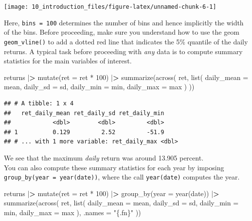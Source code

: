 \documentclass[
]{book}
\newenvironment{Shaded}{\begin{snugshade}}{\end{snugshade}}
\newcommand{\AttributeTok}[1]{\textcolor[rgb]{0.61,0.61,0.61}{#1}}
\newcommand{\DecValTok}[1]{\textcolor[rgb]{0.06,0.06,0.06}{#1}}
\newcommand{\ErrorTok}[1]{\textcolor[rgb]{0.14,0.14,0.14}{\textbf{#1}}}
\newcommand{\FunctionTok}[1]{\textcolor[rgb]{0,0,0}{#1}}
\newcommand{\NormalTok}[1]{#1}
\newcommand{\SpecialCharTok}[1]{\textcolor[rgb]{0,0,0}{#1}}
\newcommand{\StringTok}[1]{\textcolor[rgb]{0.5,0.5,0.5}{#1}}
\begin{document}
\begin{center}\texttt{[image: 10\_introduction\_files/figure-latex/unnamed-chunk-6-1]} \end{center}

Here, \texttt{bins\ =\ 100} determines the number of bins and hence implicitly the width of the bins.
Before proceeding, make sure you understand how to use the geom \texttt{geom\_vline()} to add a dotted red line that indicates the 5\% quantile of the daily returns.
A typical task before proceeding with \emph{any} data is to compute summary statistics for the main variables of interest.

\begin{Shaded}
\begin{Highlighting}[]
\NormalTok{returns }\SpecialCharTok{|}\ErrorTok{\textgreater{}}
  \FunctionTok{mutate}\NormalTok{(}\AttributeTok{ret =}\NormalTok{ ret }\SpecialCharTok{*} \DecValTok{100}\NormalTok{) }\SpecialCharTok{|}\ErrorTok{\textgreater{}}
  \FunctionTok{summarize}\NormalTok{(}\FunctionTok{across}\NormalTok{(}
\NormalTok{    ret,}
    \FunctionTok{list}\NormalTok{(}
      \AttributeTok{daily\_mean =}\NormalTok{ mean,}
      \AttributeTok{daily\_sd =}\NormalTok{ sd,}
      \AttributeTok{daily\_min =}\NormalTok{ min,}
      \AttributeTok{daily\_max =}\NormalTok{ max}
\NormalTok{    )}
\NormalTok{  ))}
\end{Highlighting}
\end{Shaded}

\begin{verbatim}
## # A tibble: 1 x 4
##   ret_daily_mean ret_daily_sd ret_daily_min
##            <dbl>        <dbl>         <dbl>
## 1          0.129         2.52         -51.9
## # ... with 1 more variable: ret_daily_max <dbl>
\end{verbatim}

We see that the maximum \emph{daily} return was around 13.905 percent.\\
You can also compute these summary statistics for each year by imposing \texttt{group\_by(year\ =\ year(date))}, where the call \texttt{year(date)} computes the year.

\begin{Shaded}
\begin{Highlighting}[]
\NormalTok{returns }\SpecialCharTok{|}\ErrorTok{\textgreater{}}
  \FunctionTok{mutate}\NormalTok{(}\AttributeTok{ret =}\NormalTok{ ret }\SpecialCharTok{*} \DecValTok{100}\NormalTok{) }\SpecialCharTok{|}\ErrorTok{\textgreater{}}
  \FunctionTok{group\_by}\NormalTok{(}\AttributeTok{year =} \FunctionTok{year}\NormalTok{(date)) }\SpecialCharTok{|}\ErrorTok{\textgreater{}}
  \FunctionTok{summarize}\NormalTok{(}\FunctionTok{across}\NormalTok{(}
\NormalTok{    ret,}
    \FunctionTok{list}\NormalTok{(}
      \AttributeTok{daily\_mean =}\NormalTok{ mean,}
      \AttributeTok{daily\_sd =}\NormalTok{ sd,}
      \AttributeTok{daily\_min =}\NormalTok{ min,}
      \AttributeTok{daily\_max =}\NormalTok{ max}
\NormalTok{    ),}
    \AttributeTok{.names =} \StringTok{"\{.fn\}"}
\NormalTok{  ))}
\end{Highlighting}
\end{Shaded}
\end{document}
